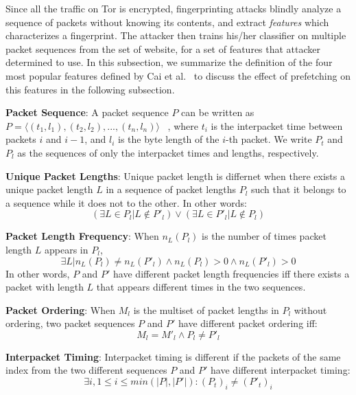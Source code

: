 Since all the traffic on Tor is encrypted, fingerprinting attacks blindly analyze a sequence of packets without knowing its contents, and extract {\it features} which characterizes a fingerprint.
The attacker then trains his/her classifier on multiple packet sequences from the set of website, for a set of features that attacker determined to use.
In this subsection, we summarize the definition of the four most popular features defined by Cai et al.~\cite{Cai:2014kjb} to discuss the effect of prefetching on this features in the following subsection.

{\bf Packet Sequence}:
A packet sequence $P$ can be written as $P = \langle(t_1, l_1), (t_2, l_2), ..., (t_n, l_n)\rangle$ ~\cite{Cai:2014kjb}, where $t_i$ is the interpacket time between packets $i$ and $i-1$, and $l_i$ is the byte length of the $i$-th packet.
We write $P_t$ and $P_l$ as the sequences of only the interpacket times and lengths, respectively.

{\bf Unique Packet Lengths}: 
Unique packet length is differnet when there exists a unique packet length $L$ in a sequence of packet lengths $P_l$ such that it belongs to a sequence while it does not to the other. In other words:
\begin{equation}
(\exists L \in P_l | L \notin P'_l ) \vee (\exists L \in P'_l | L \notin P_l)
\end{equation}

{\bf Packet Length Frequency}:
When $n_L(P_l)$ is the number of times packet length $L$ appears in $P_l$,
\begin{equation}
\exists L|n_L(P_l) \neq n_L(P'_l) \wedge n_L(P_l)>0 \wedge n_L(P'_l) >0
\end{equation}
In other words, $P$ and $P'$ have different packet length frequencies iff there exists a packet with length $L$ that appears different times in the two sequences.

{\bf Packet Ordering}:
When $M_l$ is the multiset of packet lengths in $P_l$ without ordering, two packet sequences $P$ and $P'$ have different packet ordering iff:
\begin{equation}
M_{ l }=M'_{ l }\wedge P_{ l }\neq P'_{ l }
\end{equation}

{\bf Interpacket Timing}:
Interpacket timing is different if the packets of the same index from the two different sequences $P$ and $P'$ have different interpacket timing:
\begin{equation}
\exists i, 1 \le i \le \mathit{min}(|P|, |P'|) : (P_t)_i \neq (P'_t)_i
\end{equation}

